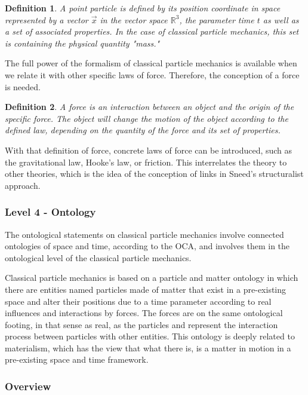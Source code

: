 \documentclass{article}
\newtheorem{mydef}{Definition} %
\begin{document}
\begin{mydef}
A point particle is defined by its position coordinate in space represented by a vector $\vec x$ in the vector space $\mathbb{R}^3$, the parameter time $t$ as well as a set of associated properties. In the case of classical particle mechanics, this set is containing the physical quantity "mass."
\end{mydef}

The full power of the formalism of classical particle mechanics is available when we relate it with other specific laws of force. Therefore, the conception of a force is needed.

\begin{mydef}
A force is an interaction between an object and the origin of the specific force. The object will change the motion of the object according to the defined law, depending on the quantity of the force and its set of properties.
\end{mydef}

With that definition of force, concrete laws of force can be introduced, such as the gravitational law, Hooke's law, or friction. This interrelates the theory to other theories, which is the idea of the conception of links in Sneed's structuralist approach. 

\subsubsection*{Level 4 - Ontology}

The ontological statements on classical particle mechanics involve connected ontologies of space and time, according to the OCA, and involves them in the ontological level of the classical particle mechanics. \newline

Classical particle mechanics is based on a particle and matter ontology in which there are entities named particles made of matter that exist in a pre-existing space and alter their positions due to a time parameter according to real influences and interactions by forces. The forces are on the same ontological footing, in that sense as real, as the particles and represent the interaction process between particles with other entities. This ontology is deeply related to materialism, which has the view that what there is, is a matter in motion in a pre-existing space and time framework.   

\newpage
\subsubsection*{Overview}
\end{document}
